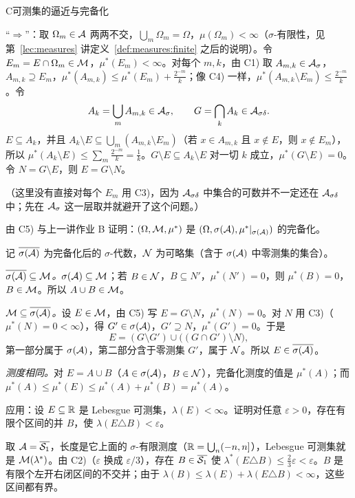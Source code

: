 \begin{probleme}{C}{可测集的逼近与完备化}
\begin{questions}
\begin{solution}
“$\Rightarrow$”：取 $\Omega_m\in\mathcal{A}$ 两两不交，$\bigcup_m\Omega_m=\Omega$，$\mu(\Omega_m)<\infty$（$\sigma$-有限性，见第~\ref{lec:measures} 讲定义~\ref{def:measures:finite} 之后的说明）。令 $E_m=E\cap\Omega_m\in\mathcal{M}$，$\mu^*(E_m)<\infty$。对每个 $m,k$，由 C1) 取 $A_{m,k}\in\mathcal{A}_\sigma$，$A_{m,k}\supseteq E_m$，$\mu^*(A_{m,k})\leqslant\mu^*(E_m)+\frac{2^{-m}}k$；像 C4) 一样，$\mu^*(A_{m,k}\setminus E_m)\leqslant\frac{2^{-m}}k$。令
\[
A_k=\bigcup_mA_{m,k}\in\mathcal{A}_\sigma,\qquad G=\bigcap_kA_k\in\mathcal{A}_{\sigma\delta}.
\]
$E\subseteq A_k$，并且 $A_k\setminus E\subseteq\bigcup_m(A_{m,k}\setminus E_m)$（若 $x\in A_{m,k}$ 且 $x\notin E$，则 $x\notin E_m$），所以 $\mu^*(A_k\setminus E)\leqslant\sum_m\frac{2^{-m}}k=\frac1k$。$G\setminus E\subseteq A_k\setminus E$ 对一切 $k$ 成立，$\mu^*(G\setminus E)=0$。令 $N=G\setminus E$，则 $E=G\setminus N$。

（这里没有直接对每个 $E_m$ 用 C3)，因为 $\mathcal{A}_{\sigma\delta}$ 中集合的可数并不一定还在 $\mathcal{A}_{\sigma\delta}$ 中；先在 $\mathcal{A}_\sigma$ 这一层取并就避开了这个问题。）
\end{solution}
\item 由 C5) 与上一讲作业 B 证明：$(\Omega,\mathcal{M},\mu^*)$ 是 $(\Omega,\sigma(\mathcal{A}),\mu^*|_{\sigma(\mathcal{A})})$ 的完备化。
\begin{solution}
记 $\overline{\sigma(\mathcal{A})}$ 为完备化后的 $\sigma$-代数，$\mathcal{N}$ 为可略集（含于 $\sigma(\mathcal{A})$ 中零测集的集合）。

\emph{$\overline{\sigma(\mathcal{A})}\subseteq\mathcal{M}$。}$\sigma(\mathcal{A})\subseteq\mathcal{M}$；若 $B\in\mathcal{N}$，$B\subseteq N'$，$\mu^*(N')=0$，则 $\mu^*(B)=0$，$B\in\mathcal{M}$。所以 $A\cup B\in\mathcal{M}$。

\emph{$\mathcal{M}\subseteq\overline{\sigma(\mathcal{A})}$。}设 $E\in\mathcal{M}$，由 C5) 写 $E=G\setminus N$，$\mu^*(N)=0$。对 $N$ 用 C3)（$\mu^*(N)=0<\infty$），得 $G'\in\sigma(\mathcal{A})$，$G'\supseteq N$，$\mu^*(G')=0$。于是
\[
E=(G\setminus G')\cup\bigl((G\cap G')\setminus N\bigr),
\]
第一部分属于 $\sigma(\mathcal{A})$，第二部分含于零测集 $G'$，属于 $\mathcal{N}$。所以 $E\in\overline{\sigma(\mathcal{A})}$。

\emph{测度相同。}对 $E=A\cup B$（$A\in\sigma(\mathcal{A})$，$B\in\mathcal{N}$），完备化测度的值是 $\mu^*(A)$；而 $\mu^*(A)\leqslant\mu^*(E)\leqslant\mu^*(A)+\mu^*(B)=\mu^*(A)$。
\end{solution}
\item 应用：设 $E\subseteq\mathbb{R}$ 是 Lebesgue 可测集，$\lambda(E)<\infty$。证明对任意 $\varepsilon>0$，存在有限个区间的并 $B$，使 $\lambda(E\triangle B)<\varepsilon$。
\begin{solution}
取 $\mathcal{A}=\overline{\mathcal{S}_1}$，长度是它上面的 $\sigma$-有限测度（$\mathbb{R}=\bigcup_n(-n,n]$），Lebesgue 可测集就是 $\mathcal{M}(\lambda^*)$。由 C2)（$\varepsilon$ 换成 $\varepsilon/3$），存在 $B\in\overline{\mathcal{S}_1}$ 使 $\lambda^*(E\triangle B)\leqslant\frac23\varepsilon<\varepsilon$。$B$ 是有限个左开右闭区间的不交并；由于 $\lambda(B)\leqslant\lambda(E)+\lambda(E\triangle B)<\infty$，这些区间都有界。


\end{solution}
\end{questions}
\end{probleme}

